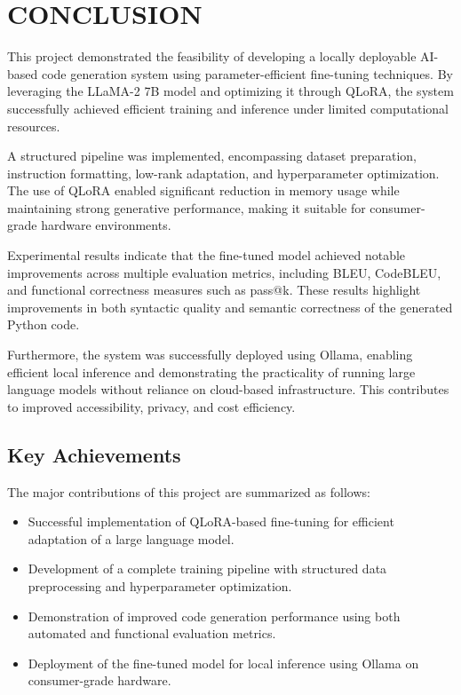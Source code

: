 \chapter{CONCLUSION}

This project demonstrated the feasibility of developing a locally deployable AI-based code generation system using parameter-efficient fine-tuning techniques. By leveraging the LLaMA-2 7B model and optimizing it through QLoRA, the system successfully achieved efficient training and inference under limited computational resources.

A structured pipeline was implemented, encompassing dataset preparation, instruction formatting, low-rank adaptation, and hyperparameter optimization. The use of QLoRA enabled significant reduction in memory usage while maintaining strong generative performance, making it suitable for consumer-grade hardware environments.

Experimental results indicate that the fine-tuned model achieved notable improvements across multiple evaluation metrics, including BLEU, CodeBLEU, and functional correctness measures such as pass@k. These results highlight improvements in both syntactic quality and semantic correctness of the generated Python code.

Furthermore, the system was successfully deployed using Ollama, enabling efficient local inference and demonstrating the practicality of running large language models without reliance on cloud-based infrastructure. This contributes to improved accessibility, privacy, and cost efficiency.

\section{Key Achievements}

The major contributions of this project are summarized as follows:
\begin{itemize}
    \item Successful implementation of QLoRA-based fine-tuning for efficient adaptation of a large language model.
    \item Development of a complete training pipeline with structured data preprocessing and hyperparameter optimization.
    \item Demonstration of improved code generation performance using both automated and functional evaluation metrics.
    \item Deployment of the fine-tuned model for local inference using Ollama on consumer-grade hardware.
\end{itemize}

